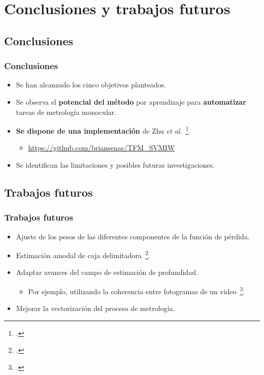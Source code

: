\section{Conclusiones y trabajos futuros}
\subsection{Conclusiones}
\begin{frame}
  \frametitle{Conclusiones}
  \begin{itemize}
    \item Se han alcanzado los cinco objetivos planteados.
    \item Se observa el \textbf{potencial del método} por aprendizaje para \textbf{automatizar} tareas de metrología monocular.
    \item \textbf{Se dispone de una implementación} de Zhu \emph{et al.}~\footcite{SVMIW}.
      \begin{itemize}
        \item \url{https://github.com/briansenas/TFM_SVMIW}
      \end{itemize}
    \item Se identifican las limitaciones y posibles futuras investigaciones.
  \end{itemize}
\end{frame}


\subsection{Trabajos futuros}
\begin{frame}
  \frametitle{Trabajos futuros}
  \begin{itemize}
    \item Ajuste de los pesos de las diferentes componentes de la función de pérdida.
    \item Estimación amodal de caja delimitadora~\footcite{kar2015amodalcompletionsizeconstancy}.
    \item Adaptar avances del campo de estimación de profundidad.
      \begin{itemize}
        \item Por ejemplo, utilizando la coherencia entre fotogramas de un video~\footcite{ke2025videodepthvideomodels}.
      \end{itemize}
    \item Mejorar la vectorización del proceso de metrología.
  \end{itemize}
\end{frame}

